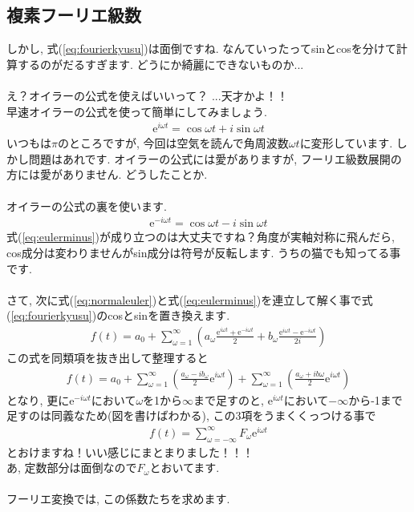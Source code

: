 \documentclass[11pt,a4paper]{jreport}
\begin{document}
\subsection{複素フーリエ級数}
しかし, 式(\ref{eq:fourierkyusu})は面倒ですね. なんていったってsinとcosを分けて計算するのがだるすぎます. どうにか綺麗にできないものか...\\
\\
え？オイラーの公式を使えばいいって？ ...天才かよ！！
\\
早速オイラーの公式を使って簡単にしてみましょう. 
\begin{eqnarray}
\mathrm{e}^{i\omega t} = \cos\omega t + i\sin\omega t
\label{eq:normaleuler}
\end{eqnarray}
いつもは$\pi$のところですが, 今回は空気を読んで角周波数$\omega t$に変形しています. しかし問題はあれです. オイラーの公式には愛がありますが, フーリエ級数展開の方には愛がありません. どうしたことか.\\
\\
オイラーの公式の裏を使います.
\begin{eqnarray}
\mathrm{e}^{-i\omega t} = \cos\omega t - i\sin\omega t
\label{eq:eulerminus}
\end{eqnarray}
式(\ref{eq:eulerminus})が成り立つのは大丈夫ですね？角度が実軸対称に飛んだら, cos成分は変わりませんがsin成分は符号が反転します. うちの猫でも知ってる事です.\\
\\
さて, 次に式(\ref{eq:normaleuler})と式(\ref{eq:eulerminus})を連立して解く事で式(\ref{eq:fourierkyusu})のcosとsinを置き換えます. \\
\begin{eqnarray}
f(t) = a_0 + \sum_{\omega=1}^\infty {(a_\omega \frac{\mathrm{e}^{i\omega t}+\mathrm{e}^{-i\omega t}}{2} + b_\omega \frac{\mathrm{e}^{i\omega t} - \mathrm{e}^{-i\omega t}}{2i})}
\label{eq:complexfourier}
\end{eqnarray}
この式を同類項を抜き出して整理すると
\begin{eqnarray}
f(t) = a_0 + \sum_{\omega=1}^\infty {(\frac{a_\omega - ib_\omega}{2}\mathrm{e}^{i\omega t})} + \sum_{\omega=1}^\infty {(\frac{a_\omega + ib\omega}{2}\mathrm{e}^{i\omega t})}
\label{eq:complexfourierkai}
\end{eqnarray}
となり, 更に$\mathrm{e}^{-i\omega t}$において$\omega$を1から$\infty$まで足すのと, $\mathrm{e}^{i\omega t}$において$-\infty$から-1まで足すのは同義なため(図を書けばわかる), この3項をうまくくっつける事で
\begin{eqnarray}
f(t) = \sum_{\omega = -\infty}^\infty F_\omega \mathrm{e}^{i\omega t}
\end{eqnarray}
とおけますね！いい感じにまとまりました！！！\\
あ, 定数部分は面倒なので$F_\omega$とおいてます. \\
\\
フーリエ変換では, この係数たちを求めます. 
\end{document}
